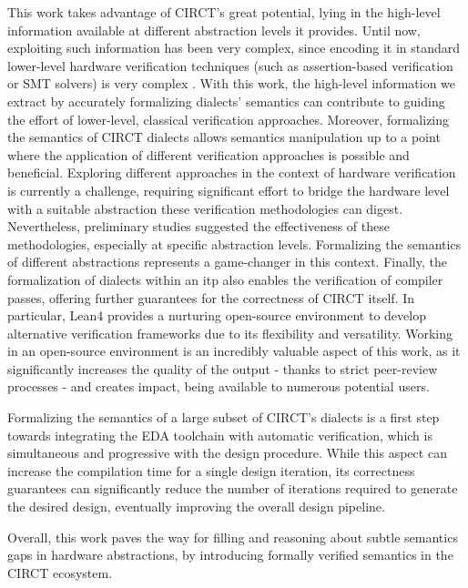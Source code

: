 \documentclass[acmtog]{acmart}
\begin{document}
This work takes advantage of CIRCT's great potential, lying in the high-level information available at different abstraction levels it provides. 
Until now, exploiting such information has been very complex, since encoding it in standard lower-level hardware verification techniques 
(such as assertion-based verification or SMT solvers) is very complex \cite{symbiyosys, witharana2022survey}. 
With this work, the high-level information we extract by accurately formalizing dialects' semantics can contribute to guiding the effort of lower-level, 
classical verification approaches.   
Moreover, formalizing the semantics of CIRCT dialects allows semantics manipulation up to a point where the application of different verification approaches is possible and beneficial. 
Exploring different approaches in the context of hardware verification is currently a challenge, requiring significant effort to bridge the hardware level 
with a suitable abstraction these verification methodologies can digest\cite{mukherjee2015hardware, malik2008hardware}. Nevertheless, preliminary studies 
suggested the effectiveness of these methodologies, especially at specific abstraction levels\cite{bernstein2021semantics}. 
Formalizing the semantics of different abstractions represents a game-changer in this context. 
Finally, the formalization of dialects within an \ac{itp} also enables the verification of compiler passes, offering further guarantees for the correctness
of CIRCT itself. 
In particular, Lean4 provides a nurturing open-source environment to develop alternative verification frameworks due to its flexibility and versatility. 
Working in an open-source environment is an incredibly valuable aspect of this work, as it significantly increases the quality of the output - thanks to strict peer-review processes - 
and creates impact, being available to numerous potential users.  

Formalizing the semantics of a large subset of CIRCT's dialects is a first step towards integrating the EDA toolchain with automatic verification, 
which is simultaneous and progressive with the design procedure. While this aspect can increase the compilation time for a single design iteration, 
its correctness guarantees can significantly reduce the number of iterations required to generate the desired design, 
eventually improving the overall design pipeline.

Overall, this work paves the way for filling and reasoning about subtle semantics gaps in hardware abstractions, by introducing formally verified semantics 
in the CIRCT ecosystem.
\end{document}
